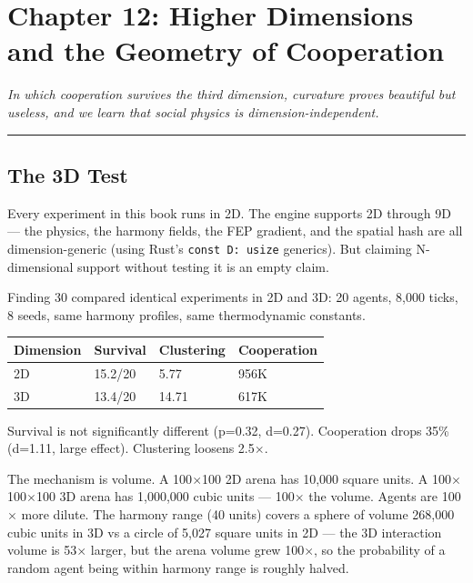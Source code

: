 \chapter{Chapter 12: Higher Dimensions and the Geometry of Cooperation}\label{chapter-12-higher-dimensions-and-the-geometry-of-cooperation}

\emph{In which cooperation survives the third dimension, curvature proves beautiful but useless, and we learn that social physics is dimension-independent.}

\begin{center}\rule{0.5\linewidth}{0.5pt}\end{center}

\section{The 3D Test}\label{the-3d-test}

Every experiment in this book runs in 2D. The engine supports 2D through 9D --- the physics, the harmony fields, the FEP gradient, and the spatial hash are all dimension-generic (using Rust's \texttt{const\ D:\ usize} generics). But claiming N-dimensional support without testing it is an empty claim.

Finding 30 compared identical experiments in 2D and 3D: 20 agents, 8,000 ticks, 8 seeds, same harmony profiles, same thermodynamic constants.

\begin{longtable}[]{@{}llll@{}}
\toprule\noalign{}
Dimension & Survival & Clustering & Cooperation \\
\midrule\noalign{}
\endhead
\bottomrule\noalign{}
\endlastfoot
2D & 15.2/20 & 5.77 & 956K \\
3D & 13.4/20 & 14.71 & 617K \\
\end{longtable}

Survival is not significantly different (p=0.32, d=0.27). Cooperation drops 35\% (d=1.11, large effect). Clustering loosens 2.5$\times$.

The mechanism is volume. A 100$\times$100 2D arena has 10,000 square units. A 100$\times$100$\times$100 3D arena has 1,000,000 cubic units --- 100$\times$ the volume. Agents are 100$\times$ more dilute. The harmony range (40 units) covers a sphere of volume 268,000 cubic units in 3D vs a circle of 5,027 square units in 2D --- the 3D interaction volume is 53$\times$ larger, but the arena volume grew 100$\times$, so the probability of a random agent being within harmony range is roughly halved.

